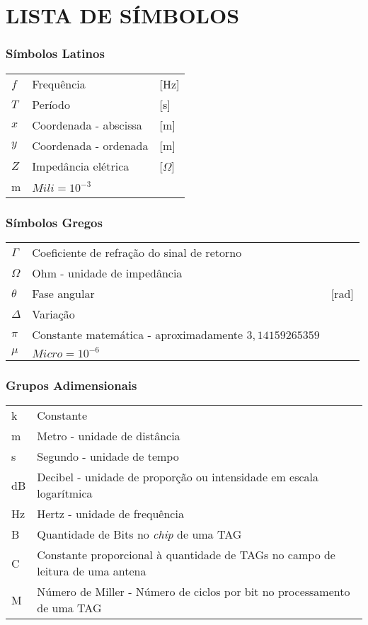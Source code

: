 




\chapter*{LISTA DE SÍMBOLOS}




\subsection*{Símbolos Latinos}

\begin{tabular}{p{}p{}>{\PreserveBacklash\raggedleft}p{}}
$f$ & Frequência  & {[}Hz{]}\tabularnewline
$T$ & Período & {[}s{]} \tabularnewline
$x$ & Coordenada - abscissa & {[}m{]} \tabularnewline
$y$ & Coordenada - ordenada & {[}m{]} \tabularnewline
$Z$ & Impedância elétrica & {[}$\Omega${]} \tabularnewline
m & $Mili = 10^{-3}$ \tabularnewline
\end{tabular}


\subsection*{Símbolos Gregos}

\begin{tabular}{p{}p{}>{\PreserveBacklash\raggedleft}p{}}
$\Gamma$ & Coeficiente de refração do sinal de retorno \tabularnewline
$\Omega$ & Ohm - unidade de impedância \tabularnewline
$\theta$ & Fase angular & {[}rad{]} \tabularnewline
$\Delta$ & Variação \tabularnewline
$\pi$ & Constante matemática - aproximadamente $3,14159265359$ \tabularnewline
$\mu$ & $Micro = 10^{-6}$ \tabularnewline
\end{tabular}


\subsection*{Grupos Adimensionais}

\begin{tabular}{p{}p{}}
k & Constante\tabularnewline
m & Metro - unidade de distância \tabularnewline
s & Segundo - unidade de tempo \tabularnewline
dB & Decibel - unidade de proporção ou intensidade em escala logarítmica \tabularnewline
Hz & Hertz - unidade de frequência \tabularnewline
B & Quantidade de Bits no \textit{chip} de uma TAG \tabularnewline
C & Constante proporcional à quantidade de TAGs no campo de leitura de uma antena \tabularnewline
M & Número de Miller - Número de ciclos por bit no processamento de uma TAG \tabularnewline
\end{tabular}


